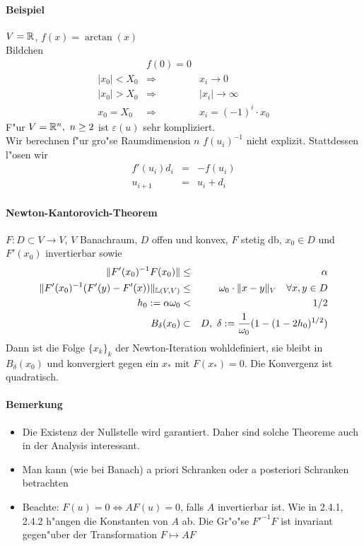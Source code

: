 \documentclass{scrartcl}
\begin{document}
\paragraph*{Beispiel} $V = \mathbb{R}$, $f(x) = \arctan(x)$ \\
Bildchen \\
\begin{eqnarray*}
& f(0) = 0 \\
\vert x_0 \vert < X_0 & \Rightarrow & x_i \rightarrow 0 \\
\vert x_0 \vert > X_0 & \Rightarrow & \vert x_i \vert  \rightarrow \infty \\
x_0 = X_0& \Rightarrow & x_i = (-1)^i \cdot x_0
\end{eqnarray*}
F"ur $V=\mathbb{R}^n, \ n \geq 2$ ist $\varepsilon(u)$ sehr kompliziert. \\
Wir berechnen f"ur gro"se Raumdimension $n$ $f(u_i)^{-1}$ nicht explizit. Stattdessen l"osen wir
\begin{eqnarray*}
f'(u_i) d_i & = & -f(u_i) \\
u_{i+1} &= & u_i + d_i
\end{eqnarray*} 

\paragraph{Newton-Kantorovich-Theorem}
$F: D \subset V \longrightarrow V$, $V$ Banachraum, $D$ offen und konvex, $F$ stetig db, $x_0 \in D$ und $F'(x_0)$ invertierbar sowie
\begin{eqnarray*}
\Vert F'(x_0)^{-1} F(x_0) \Vert & \leq &  \alpha \\
\Vert F'(x_0)^{-1} (F'(y) - F'(x)) \Vert_{\mathbb{L}(V,V)} & \leq & \omega_0 \cdot \Vert x - y \Vert_V \quad \forall x,y \in D \\
h_0 := \alpha \omega_0 & < & 1/2 \\
B_\delta(x_0) & \subset & D, \ \delta := \frac{1}{\omega_0} ( 1- (1- 2 h_0)^{1/2})\\
\end{eqnarray*}
Dann ist die Folge $\{ x_k \}_k$ der Newton-Iteration wohldefiniert, sie bleibt in $B_\delta(x_0)$ und konvergiert gegen ein $x_*$ mit $F(x_*) = 0$. Die Konvergenz ist quadratisch.
\paragraph*{Bemerkung}
\begin{itemize}
\item Die Existenz der Nullstelle wird garantiert. Daher sind solche Theoreme auch in der Analysis interessant.
\item Man kann (wie bei Banach) a priori Schranken oder a posteriori Schranken betrachten 
\item Beachte: $F(u) = 0 \Leftrightarrow AF(u) = 0$, falls $A$ invertierbar ist. Wie in 2.4.1, 2.4.2 h"angen die Konstanten von $A$ ab. Die Gr"o"se $F'^{-1}F$ ist invariant gegen"uber der Transformation $F \mapsto AF$
\end{itemize}
\end{document}
